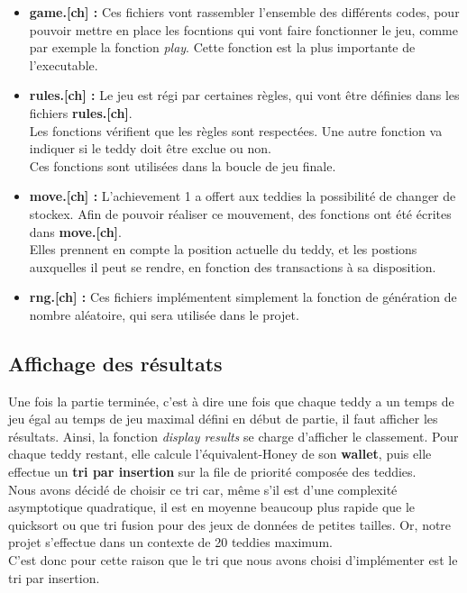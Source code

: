 \documentclass{article}
\begin{document}
\begin{itemize}
\item\textbf{game.[ch] :} Ces fichiers vont rassembler l'ensemble des diff\'erents codes, pour pouvoir mettre en place les focntions qui vont faire fonctionner le jeu,
comme par exemple la fonction \textit{play}.
Cette fonction est la plus importante de l'executable.  

\item\textbf{rules.[ch] :} Le jeu est r\'egi par certaines r\`egles, qui vont \^etre d\'efinies dans les fichiers \textbf{rules.[ch]}.\\
Les fonctions v\'erifient que les r\`egles sont respect\'ees. Une autre fonction  va indiquer si le teddy doit \^etre exclue ou non.\\
Ces fonctions sont utilis\'ees dans la boucle de jeu finale. 

\item\textbf{move.[ch] :} L'achievement 1 a offert aux teddies la possibilit\'e de changer de stockex. Afin de pouvoir r\'ealiser ce mouvement, des fonctions ont \'et\'e \'ecrites dans \textbf{move.[ch]}.\\
Elles prennent en compte la position actuelle du teddy, et les postions auxquelles il peut se rendre, en fonction des transactions \`a sa disposition. 

\item\textbf{rng.[ch] :} Ces fichiers impl\'ementent simplement la fonction de g\'en\'eration de nombre al\'eatoire, qui sera utilis\'ee dans le projet. 

\end{itemize}

\subsection{Affichage des r\'esultats}

Une fois la partie termin\'ee, c'est \`a dire une fois que chaque teddy a un temps de jeu \'egal au temps de jeu maximal d\'efini en d\'ebut de partie, il faut afficher les r\'esultats.
Ainsi, la fonction 
\textit{display results} 
se charge d'afficher le classement.
Pour chaque teddy restant, elle calcule l'\'equivalent-Honey de son 
\textbf{wallet},
puis elle effectue un 
\textbf{tri par insertion} 
sur la file de priorit\'e compos\'ee des teddies.\\

Nous avons d\'ecid\'e de choisir ce tri car, m\^eme s'il est d'une complexit\'e asymptotique quadratique, il est en moyenne beaucoup plus rapide que le quicksort ou que tri fusion pour des jeux de donn\'ees de petites tailles.
Or, notre projet s'effectue dans un contexte de 20 teddies maximum. \\
C'est donc pour cette raison que le tri que nous avons choisi d'impl\'ementer est le tri par insertion.
\end{document}
